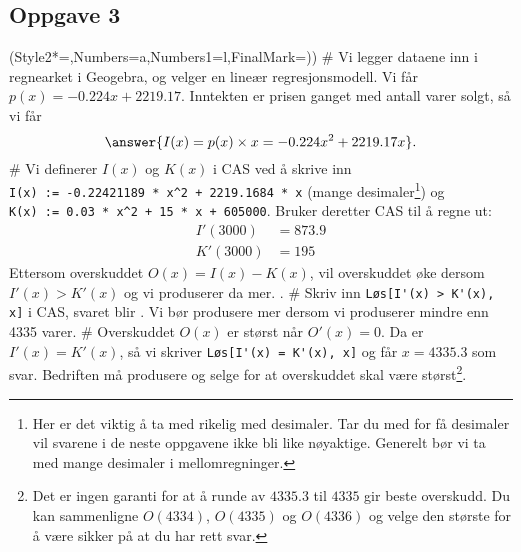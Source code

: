 \subsection*{Oppgave 3}
\begin{easylist}[enumerate]
	\ListProperties(Style2*=,Numbers=a,Numbers1=l,FinalMark={)})
	# Vi legger dataene inn i regnearket i Geogebra, og velger en lineær regresjonsmodell. Vi får $p(x) = -0.224x +2219.17$.
	Inntekten er prisen ganget med antall varer solgt, så vi får
	\begin{equation*}
		\answer{I(x) = p(x) \times x = -0.224x^2 +2219.17x}.
	\end{equation*}
	# Vi definerer $I(x)$ og $K(x)$ i CAS ved å skrive inn \\
	\verb|I(x) := -0.22421189 * x^2 + 2219.1684 * x| (mange desimaler\footnote{Her er det viktig å ta med rikelig med desimaler. Tar du med for få desimaler vil svarene i de neste oppgavene ikke bli like nøyaktige. Generelt bør vi ta med mange desimaler i mellomregninger.})
	og  \\
	\verb|K(x) := 0.03 * x^2 + 15 * x + 605000|.
	Bruker deretter CAS til å regne ut:
	\begin{align*}
		I'(3000) &= 873.9\\
		K'(3000) &= 195
	\end{align*}
	Ettersom overskuddet $O(x) = I(x)  - K(x)$, vil overskuddet øke
	dersom $I'(x) > K'(x)$ og vi produserer da mer.
	.
	# Skriv inn \verb|Løs[I'(x) > K'(x), x]| i CAS, svaret blir
	.
	Vi bør produsere mer dersom vi produserer mindre enn 4335 varer.
	# Overskuddet $O(x)$ er størst når $O'(x) = 0$.
	Da er $I'(x) = K'(x)$, så vi skriver \verb|Løs[I'(x) = K'(x), x]|
	og får $x = 4335.3$ som svar. Bedriften må produsere og selge
	 for at overskuddet skal være størst\footnote{Det er ingen garanti for at å runde av $4335.3$ til $4335$ gir beste overskudd. Du kan sammenligne $O(4334)$, $O(4335)$ og $O(4336)$ og velge den største for å være sikker på at du har rett svar.}.
\end{easylist}

